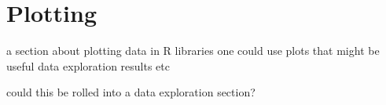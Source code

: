 
\section{Plotting} 
\label{advanced:plotting}

a section about plotting data in R
libraries one could use
plots that might be useful
data exploration
results 
etc

could this be rolled into a data exploration section?




